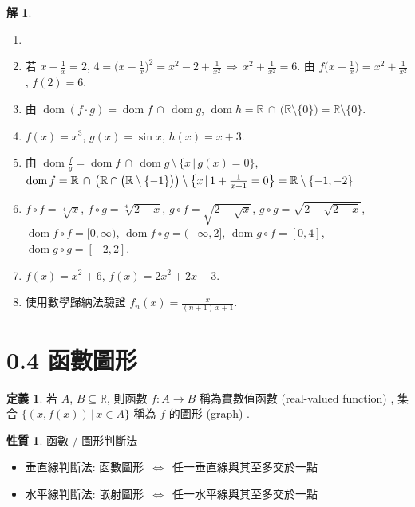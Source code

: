 \documentclass[12pt]{extarticle}
\newcommand{\ds}{\displaystyle}
\newcommand{\ie}{\,\Longrightarrow\,}
\newcommand{\ifff}{\,\Longleftrightarrow\,}
\DeclareMathOperator*{\dom}{dom}
\theoremstyle{definition}
\newtheorem*{dfn}{定義}
\newtheorem*{prp}{性質}
\newtheorem*{sol}{解}
\begin{document}

\begin{sol}
  \begin{enumerate}\setlength\itemsep{0em}
    \item[] 
    \item 若 $\ds x - \frac{1}{x} = 2$, $\ds 4 = \Big(x - \frac{1}{x}\Big)^2 = x^2 - 2 + \frac{1}{x^2}\ie x^2 + \frac{1}{x^2} = 6$. 由 $\ds f\Big(x - \frac{1}{x}\Big) = x^2 + \frac{1}{x^2}$, $f(2) = 6$. 
    \item 由 $\dom(f\cdot g) = \dom f\,\cap\,\dom g$, $\dom h = \mathbb{R}\,\cap\,\big(\mathbb{R}\setminus\{0\}\big) = \mathbb{R}\setminus\{0\}$. 
    \item $f(x) = x^3$, $g(x) = \sin x$, $h(x) = x + 3$. 
    \item 由 $\ds\dom\frac{f}{g} = \dom f\,\cap\,\dom g\,\setminus\,\{ x\,|\,g(x) = 0\}$, $\dom f = \mathbb{R}\,\cap\,\big(\mathbb{R}\cap\big(\mathbb{R}\setminus\{-1\}\big)\big)\setminus\big\{x\,|\,1 + \frac{1}{x + 1} = 0\big\} \\= \mathbb{R}\setminus\{-1, -2\}$
    \item $f\circ f = \sqrt[4]{x}$, $f\circ g = \sqrt[4]{2 - x}$, $g\circ f = \sqrt{2 - \sqrt{x}}$, $g\circ g = \sqrt{2 - \sqrt{2 - x}}$, $\dom f\circ f = [0, \infty)$, $\dom f\circ g = (-\infty, 2]$, $\dom g\circ f = [0, 4]$, $\dom g\circ g = [-2, 2]$. 
    \item $f(x) = x^2 + 6$, $f(x) = 2x^2 + 2x + 3$. 
    \item 使用數學歸納法驗證 $\ds f_n(x) = \frac{x}{(n + 1)\,x + 1}$. 
  \end{enumerate}
\end{sol}

\section*{0.4 函數圖形}

\begin{dfn}
  若 $A$, $B\subseteq\mathbb{R}$, 則函數 $f: A\to B$ 稱為實數值函數 (real-valued function) , 集合 $\{(x, f(x))\,|\,x\in A\}$ 稱為 $f$ 的圖形 (graph) . 
\end{dfn}

\begin{prp}函數 / 圖形判斷法
  \begin{itemize}\setlength\itemsep{0em}
    \item 垂直線判斷法: 函數圖形 $\ifff$ 任一垂直線與其至多交於一點
    \item 水平線判斷法: 嵌射圖形 $\ifff$ 任一水平線與其至多交於一點
  \end{itemize}
\end{prp}
\end{document}
